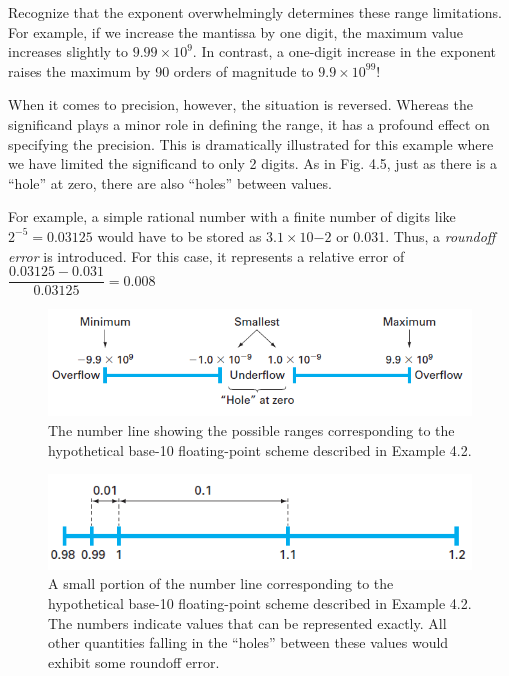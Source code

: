 \documentclass[../main.tex]{subfiles}
\begin{document}
\begin{example}
    Recognize that the exponent overwhelmingly determines these range limitations. For
    example, if we increase the mantissa by one digit, the maximum value increases slightly to
    $9.99\times 10^9$. In contrast, a one-digit increase in the exponent raises the maximum by 90 orders
    of magnitude to $9.9\times 10^{99}$!
    
    When it comes to precision, however, the situation is reversed. Whereas the significand
    plays a minor role in defining the range, it has a profound effect on specifying the precision.
    This is dramatically illustrated for this example where we have limited the significand to
    only 2 digits. As in Fig. 4.5, just as there is a ``hole'' at zero, there are also ``holes'' between
    values.
    
    For example, a simple rational number with a finite number of digits like $2^{-5} = 0.03125$
    would have to be stored as $3.1 \times 10{−2}$ or 0.031. Thus, a \emph{roundoff error} is introduced. For this
    case, it represents a relative error of\\

    $\dfrac{0.03125-0.031}{0.03125}=0.008$\\

    \begin{figure}[h]
        \includegraphics{./images/fig_4_4}
        \caption{The number line showing the possible ranges corresponding to the hypothetical base-10
        floating-point scheme described in Example 4.2.}
    \end{figure}

    \begin{figure}[h]
        \includegraphics{./images/fig_4_5}
        \caption{A small portion of the number line corresponding to the hypothetical base-10 floating-point
        scheme described in Example 4.2. The numbers indicate values that can be represented
        exactly. All other quantities falling in the ``holes'' between these values would exhibit some
        roundoff error.}
    \end{figure}


\end{example}
\end{document}
